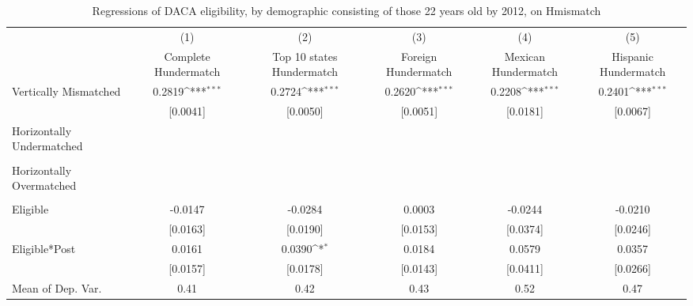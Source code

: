 \begin{table}[htbp]\centering
\def\sym#1{\ifmmode^{#1}\else\(^{#1}\)\fi}
\caption{Regressions of DACA eligibility, by demographic consisting of those 22 years old by 2012, on Hmismatch}
\begin{tabular}{l*{5}{c}}
\toprule
                    &\multicolumn{1}{c}{(1)}         &\multicolumn{1}{c}{(2)}         &\multicolumn{1}{c}{(3)}         &\multicolumn{1}{c}{(4)}         &\multicolumn{1}{c}{(5)}         \\
                    &Complete Hundermatch         &Top 10 states Hundermatch         &Foreign Hundermatch         &Mexican Hundermatch         &Hispanic Hundermatch         \\
\midrule
Vertically Mismatched&      0.2819\sym{***}&      0.2724\sym{***}&      0.2620\sym{***}&      0.2208\sym{***}&      0.2401\sym{***}\\
                    &    [0.0041]         &    [0.0050]         &    [0.0051]         &    [0.0181]         &    [0.0067]         \\
\addlinespace
Horizontally Undermatched&                     &                     &                     &                     &                     \\
                    &                     &                     &                     &                     &                     \\
\addlinespace
Horizontally Overmatched&                     &                     &                     &                     &                     \\
                    &                     &                     &                     &                     &                     \\
\addlinespace
Eligible            &     -0.0147         &     -0.0284         &      0.0003         &     -0.0244         &     -0.0210         \\
                    &    [0.0163]         &    [0.0190]         &    [0.0153]         &    [0.0374]         &    [0.0246]         \\
\addlinespace
Eligible*Post       &      0.0161         &      0.0390\sym{*}  &      0.0184         &      0.0579         &      0.0357         \\
                    &    [0.0157]         &    [0.0178]         &    [0.0143]         &    [0.0411]         &    [0.0266]         \\
\midrule
Mean of Dep. Var.   &        0.41         &        0.42         &        0.43         &        0.52         &        0.47         \\

\end{tabular}
\end{table}
